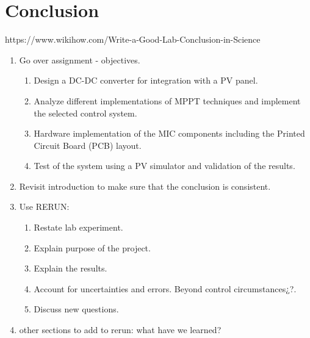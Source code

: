 \chapter{Conclusion}\label{ch:conclusion}

https://www.wikihow.com/Write-a-Good-Lab-Conclusion-in-Science
\begin{enumerate}
	\item Go over assignment - objectives.  
	\begin{enumerate}
		\item Design a DC-DC converter for integration with a PV panel.
		\item Analyze different implementations of MPPT techniques and implement the selected control system. 
		\item Hardware implementation of the MIC components including the Printed Circuit Board (PCB) layout.
		\item Test of the system using a PV simulator and validation of the results. 
	\end{enumerate}
	\item Revisit introduction to make sure that the conclusion is consistent.
	\item Use RERUN:
	\begin{enumerate}
		\item Restate lab experiment.
		\item Explain purpose of the project.
		\item Explain the results.
		\item Account for uncertainties and errors. Beyond control circumstances¿?.
		\item Discuss new questions.
	\end{enumerate}
	\item other sections to add to rerun: what have we learned?
\end{enumerate}


